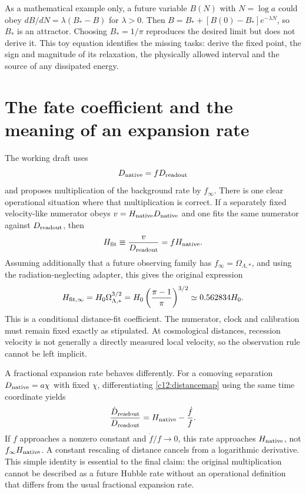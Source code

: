 As a mathematical example only, a future variable $B(N)$ with $N=\log a$ could obey $dB/dN=\lambda(B_*-B)$ for $\lambda>0$. Then $B=B_*+[B(0)-B_*]e^{-\lambda N}$, so $B_*$ is an attractor. Choosing $B_*=1/\pi$ reproduces the desired limit but does not derive it. This toy equation identifies the missing tasks: derive the fixed point, the sign and magnitude of its relaxation, the physically allowed interval and the source of any dissipated energy.

\section{The fate coefficient and the meaning of an expansion rate}
The working draft uses
\begin{equation}
 D_{\rm native}=fD_{\rm readout}
 \label{c12:distancemap}
\end{equation}
and proposes multiplication of the background rate by $f_\infty$. There is one clear operational situation where that multiplication is correct. If a separately fixed velocity-like numerator obeys $v=H_{\rm native}D_{\rm native}$ and one fits the same numerator against $D_{\rm readout}$, then
\begin{equation}
 H_{\rm fit}\equiv\frac{v}{D_{\rm readout}}
              =fH_{\rm native}.
 \label{c12:fitrate}
\end{equation}
Assuming additionally that a future observing family has $f_\infty=\Omega_{\Lambda,*}$, and using the radiation-neglecting adapter, this gives the original expression
\begin{equation}
 H_{{\rm fit},\infty}=H_0\Omega_{\Lambda,*}^{3/2}
 =H_0\left(\frac{\pi-1}{\pi}\right)^{3/2}
 \simeq0.562834H_0.
 \label{c12:conditionalfate}
\end{equation}
This is a conditional distance-fit coefficient. The numerator, clock and calibration must remain fixed exactly as stipulated. At cosmological distances, recession velocity is not generally a directly measured local velocity, so the observation rule cannot be left implicit.

A fractional expansion rate behaves differently. For a comoving separation $D_{\rm native}=a\chi$ with fixed $\chi$, differentiating \eqref{c12:distancemap} using the same time coordinate yields
\begin{equation}
 \frac{\dot D_{\rm readout}}{D_{\rm readout}}
 =H_{\rm native}-\frac{\dot f}{f}.
 \label{c12:fractionalrate}
\end{equation}
If $f$ approaches a nonzero constant and $\dot f/f\to0$, this rate approaches $H_{\rm native}$, not $f_\infty H_{\rm native}$. A constant rescaling of distance cancels from a logarithmic derivative. This simple identity is essential to the final claim: the original multiplication cannot be described as a future Hubble rate without an operational definition that differs from the usual fractional expansion rate.

